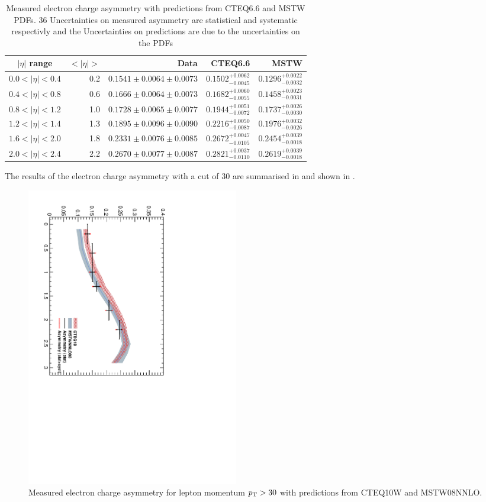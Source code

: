 \begin{table}[htbp]
\begin{center}
\begin{tabular}{crrrr}
    \toprule
$|\eta|$ range & $<|\eta|>$ & Data & CTEQ6.6 & MSTW \\
\midrule 
$0.0<|\eta|<0.4$ & 0.2 & $0.1541\pm0.0064\pm0.0073$ & $0.1502^{+0.0062}_{-0.0045}$ & $0.1296^{+0.0022}_{-0.0032}$\\
$0.4<|\eta|<0.8$ & 0.6 & $0.1666\pm0.0064\pm0.0073$ & $0.1682^{+0.0060}_{-0.0055}$ & $0.1458^{+0.0023}_{-0.0031}$\\
$0.8<|\eta|<1.2$ & 1.0 & $0.1728\pm0.0065\pm0.0077$ & $0.1944^{+0.0051}_{-0.0072}$ & $0.1737^{+0.0026}_{-0.0030}$\\
$1.2<|\eta|<1.4$ & 1.3 & $0.1895\pm0.0096\pm0.0090$ & $0.2216^{+0.0050}_{-0.0087}$ & $0.1976^{+0.0032}_{-0.0026}$\\
$1.6<|\eta|<2.0$ & 1.8 & $0.2331\pm0.0076\pm0.0085$ & $0.2672^{+0.0047}_{-0.0105}$ & $0.2454^{+0.0039}_{-0.0018}$\\
$2.0<|\eta|<2.4$ & 2.2 & $0.2670\pm0.0077\pm0.0087$ & $0.2821^{+0.0037}_{-0.0110}$ & $0.2619^{+0.0039}_{-0.0018}$\\
    \bottomrule
\end{tabular}
\caption{Measured electron charge asymmetry with predictions from CTEQ6.6 and MSTW PDFs.  36 Uncertainties on measured asymmetry are statistical and systematic respectivly and the Uncertainties on predictions are due to the uncertainties on the PDFs}
\label{tab:results25}
\end{center}
\end{table}

The results of the electron charge asymmetry with a \pT cut of \unit{30}{\GeV}
are summarised in  and shown in
.

\begin{figure}[htbp]
  \begin{center}
  \includegraphics*[width=0.45\textwidth,angle=90]{Asym_30}
  \caption{\label{fig:asym30}Measured electron charge asymmetry for lepton momentum $p_{\mathrm{T}}>30$ with predictions from CTEQ10W and MSTW08NNLO.}
  \end{center}
\end{figure}

